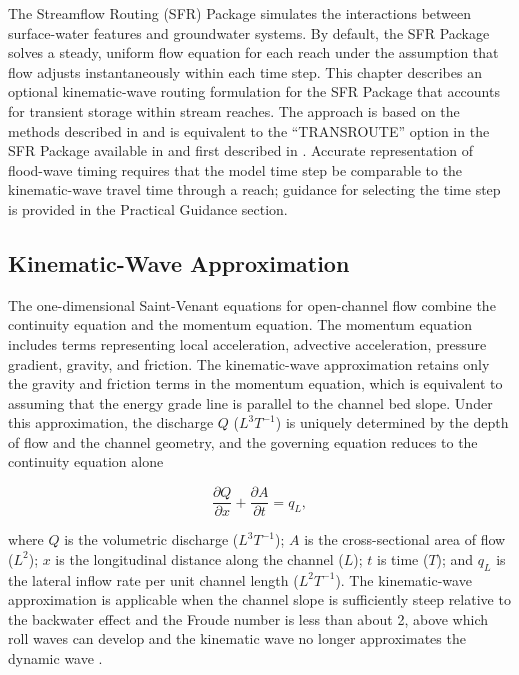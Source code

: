 The \mf Streamflow Routing (SFR) Package simulates the interactions between surface-water features and groundwater systems. By default, the SFR Package solves a steady, uniform flow equation for each reach under the assumption that flow adjusts instantaneously within each time step. This chapter describes an optional kinematic-wave routing formulation for the SFR Package that accounts for transient storage within stream reaches. The approach is based on the methods described in \cite{McArthur1993} and is equivalent to the ``TRANSROUTE'' option in the SFR Package available in \mfn \citep{modflownwt} and first described in \citet{markstrom2008gsflow}. Accurate representation of flood-wave timing requires that the model time step be comparable to the kinematic-wave travel time through a reach; guidance for selecting the time step is provided in the Practical Guidance section.

\subsection{Kinematic-Wave Approximation}

The one-dimensional Saint-Venant equations for open-channel flow combine the continuity equation and the momentum equation. The momentum equation includes terms representing local acceleration, advective acceleration, pressure gradient, gravity, and friction. The kinematic-wave approximation retains only the gravity and friction terms in the momentum equation, which is equivalent to assuming that the energy grade line is parallel to the channel bed slope. Under this approximation, the discharge $Q$ ($L^3T^{-1}$) is uniquely determined by the depth of flow and the channel geometry, and the governing equation reduces to the continuity equation alone \citep{LighthillWhitham1955, PonceSimons1977, PonceLiSimons1978}

\begin{equation}
	\label{eqn:sfr-continuity}
	\frac{\partial Q}{\partial x} + \frac{\partial A}{\partial t} = q_L ,
\end{equation}

\noindent where $Q$ is the volumetric discharge ($L^3T^{-1}$); $A$ is the cross-sectional area of flow ($L^2$); $x$ is the longitudinal distance along the channel ($L$); $t$ is time ($T$); and $q_L$ is the lateral inflow rate per unit channel length ($L^2T^{-1}$). The kinematic-wave approximation is applicable when the channel slope is sufficiently steep relative to the backwater effect and the Froude number is less than about 2, above which roll waves can develop and the kinematic wave no longer approximates the dynamic wave \citep{McArthur1993, WoolhiserLiggett1967, PonceLiSimons1978, Ponce1991}.

